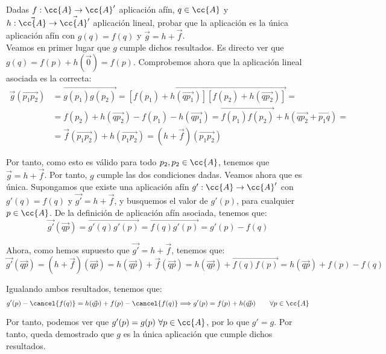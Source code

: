 \begin{ejercicio}
    Dadas $f : \cc{A} \to \cc{A}'$ aplicación afín, $q \in \cc{A}$ y $h : \vec{\cc{A}} \to \vec{\cc{A}'}$ aplicación lineal, probar que la aplicación
    es la única aplicación afín con $g(q) = f(q)$ y $\vec{g} = h + \vec{f}$.\\

    Veamos en primer lugar que $g$ cumple dichos resultados. Es directo ver que $g(q)=f(p)+h(\vec{0}) = f(p)$. Comprobemos ahora que la aplicación lineal asociada es la correcta:
    \begin{equation*}\begin{split}
        \vec{g}(\vec{p_1p_2}) &= \vec{g(p_1)g(p_2)} = \vec{[f(p_1) + h(\vec{qp_1})][f(p_2) + h(\vec{qp_2})]} =\\&= f(p_2) + h(\vec{qp_2}) - f(p_1) - h(\vec{qp_1}) = \vec{f(p_1)f(p_2)} + h(\vec{qp_2}+\vec{p_1q}) =\\&= \vec{f}(\vec{p_1p_2}) + h(\vec{p_1p_2}) = (h+\vec{f})(\vec{p_1p_2})
    \end{split}\end{equation*}
    
    Por tanto, como esto es válido para todo $p_2,p_2\in \cc{A}$, tenemos que $\vec{g} = h + \vec{f}$. Por tanto, $g$ cumple las dos condiciones dadas. Veamos ahora que es única. Supongamos que existe una aplicación afín $g':\cc{A}\to \cc{A}'$ con $g'(q)=f(q)$ y $\vec{g'}=h+\vec{f}$, y busquemos el valor de $g'(p)$, para cualquier $p\in \cc{A}$. De la definición de aplicación afín asociada, tenemos que:
    \begin{equation*}
        \vec{g'}(\vec{qp}) = \vec{g'(q)g'(p)} = \vec{f(q)g'(p)} = g'(p) - f(q)
    \end{equation*}

    Ahora, como hemos supuesto que $\vec{g'}=h+\vec{f}$, tenemos que:
    \begin{equation*}
        \vec{g'}(\vec{qp}) = (h+\vec{f})(\vec{qp}) = h(\vec{qp}) + \vec{f}(\vec{qp}) = h(\vec{qp}) + \vec{f(q)f(p)} = h(\vec{qp}) + f(p) - f(q)
    \end{equation*}

    Igualando ambos resultados, tenemos que:
    \begin{equation*}
        g'(p) - \cancel{f(q)}=h(\vec{qp}) + f(p) - \cancel{f(q)} \Longrightarrow g'(p)=f(p)+h(\vec{qp}) \qquad \forall p\in \cc{A}
    \end{equation*}

    Por tanto, podemos ver que $g'(p)=g(p)~\forall p\in \cc{A}$, por lo que $g'=g$. Por tanto, queda demostrado que $g$ es la única aplicación que cumple dichos resultados.    
\end{ejercicio}

